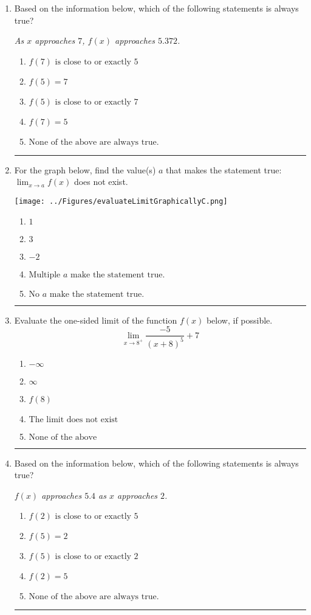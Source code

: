 \documentclass[14pt]{extbook}
\newcommand{\litem}[1]{\item#1\hspace*{-1cm}\rule{\textwidth}{0.4pt}}
\begin{document}
\begin{enumerate}
{\begin{enumerate}[label=\Alph*.]
\end{enumerate} }
\litem{
Based on the information below, which of the following statements is always true?
\begin{center}
    \textit{ As $x$ approaches $7$, $f(x)$ approaches $5.372$. }
\end{center}
\begin{enumerate}[label=\Alph*.]
\item \( f(7) \text{ is close to or exactly } 5 \)
\item \( f(5) = 7 \)
\item \( f(5) \text{ is close to or exactly } 7 \)
\item \( f(7) = 5 \)
\item \( \text{None of the above are always true.} \)

\end{enumerate} }
\litem{
For the graph below, find the value(s) $a$ that makes the statement true: $ \displaystyle \lim_{x \rightarrow a} f(x)$ does not exist.
\begin{center}
    \texttt{[image: ../Figures/evaluateLimitGraphicallyC.png]}
\end{center}
\begin{enumerate}[label=\Alph*.]
\item \( 1 \)
\item \( 3 \)
\item \( -2 \)
\item \( \text{Multiple } a \text{ make the statement true}. \)
\item \( \text{No } a \text{ make the statement true}. \)

\end{enumerate} }
\litem{
Evaluate the one-sided limit of the function $f(x)$ below, if possible.\[ \lim_{x \rightarrow 8^+} \frac{-5}{(x+8)^5}+7 \]\begin{enumerate}[label=\Alph*.]
\item \( -\infty \)
\item \( \infty \)
\item \( f(8) \)
\item \( \text{The limit does not exist} \)
\item \( \text{None of the above} \)

\end{enumerate} }
\litem{
Based on the information below, which of the following statements is always true?
\begin{center}
    \textit{ $f(x)$ approaches $5.4$ as $x$ approaches $2$. }
\end{center}
\begin{enumerate}[label=\Alph*.]
\item \( f(2) \text{ is close to or exactly } 5 \)
\item \( f(5) = 2 \)
\item \( f(5) \text{ is close to or exactly } 2 \)
\item \( f(2) = 5 \)
\item \( \text{None of the above are always true.} \)


\end{enumerate}}
\end{enumerate}
\end{document}
